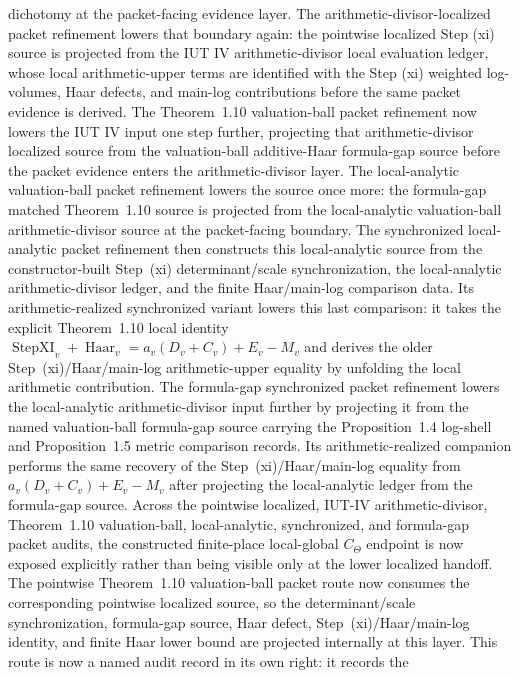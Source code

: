 \documentclass[11pt]{article}
\theoremstyle{plain}
\theoremstyle{definition}
\theoremstyle{remark}
\begin{document}
dichotomy at the packet-facing evidence layer.
The arithmetic-divisor-localized packet refinement lowers that boundary again:
the pointwise localized Step (xi) source is projected from the IUT IV
arithmetic-divisor local evaluation ledger, whose local arithmetic-upper terms
are identified with the Step (xi) weighted log-volumes, Haar defects, and
main-log contributions before the same packet evidence is derived.
The Theorem~1.10 valuation-ball packet refinement now lowers the IUT IV input
one step further, projecting that arithmetic-divisor localized source from the
valuation-ball additive-Haar formula-gap source before the packet evidence
enters the arithmetic-divisor layer.
The local-analytic valuation-ball packet refinement lowers the source once
more: the formula-gap matched Theorem~1.10 source is projected from the
local-analytic valuation-ball arithmetic-divisor source at the packet-facing
boundary.
The synchronized local-analytic packet refinement then constructs this
local-analytic source from the constructor-built Step~(xi) determinant/scale
synchronization, the local-analytic arithmetic-divisor ledger, and the finite
Haar/main-log comparison data.  Its arithmetic-realized synchronized variant
lowers this last comparison: it takes the explicit Theorem~1.10 local identity
\(\operatorname{StepXI}_v+\operatorname{Haar}_v=a_v(D_v+C_v)+E_v-M_v\)
and derives the older Step~(xi)/Haar/main-log arithmetic-upper equality by
unfolding the local arithmetic contribution.
The formula-gap synchronized packet refinement lowers the local-analytic
arithmetic-divisor input further by projecting it from the named
valuation-ball formula-gap source carrying the Proposition~1.4 log-shell and
Proposition~1.5 metric comparison records.  Its arithmetic-realized companion
performs the same recovery of the Step~(xi)/Haar/main-log equality from
\(a_v(D_v+C_v)+E_v-M_v\) after projecting the local-analytic ledger from the
formula-gap source.
Across the pointwise localized, IUT-IV arithmetic-divisor, Theorem~1.10
valuation-ball, local-analytic, synchronized, and formula-gap packet audits,
the constructed finite-place local-global \(C_\Theta\) endpoint is now exposed
explicitly rather than being visible only at the lower localized handoff.
The pointwise Theorem~1.10 valuation-ball packet route now consumes the
corresponding pointwise localized source, so the determinant/scale
synchronization, formula-gap source, Haar defect, Step~(xi)/Haar/main-log
identity, and finite Haar lower bound are projected internally at this layer.
This route is now a named audit record in its own right: it records the
\end{document}
